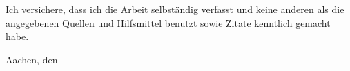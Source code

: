 
Ich versichere, dass ich die Arbeit selbständig verfasst und keine anderen als die angegebenen Quellen und Hilfsmittel benutzt sowie Zitate kenntlich gemacht habe.

Aachen, den 